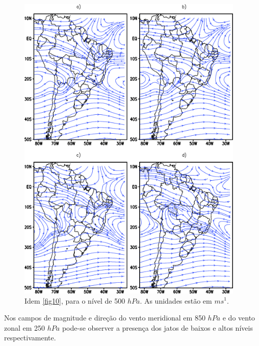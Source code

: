 \begin{figure}[!hbp]
\centering
\includegraphics[height=15cm]{./figs/media_corrente_anl_500hPa.png}
\caption{Idem \autoref{fig10}, para o nível de 500 $hPa$. As unidades estão em $ms^{1}$.}
\label{fig14}
\end{figure}

Nos campos de magnitude e direção do vento meridional em 850 $hPa$ e do vento zonal em 250 $hPa$ pode-se observer a presença dos jatos de baixos e altos níveis respectivamente.

